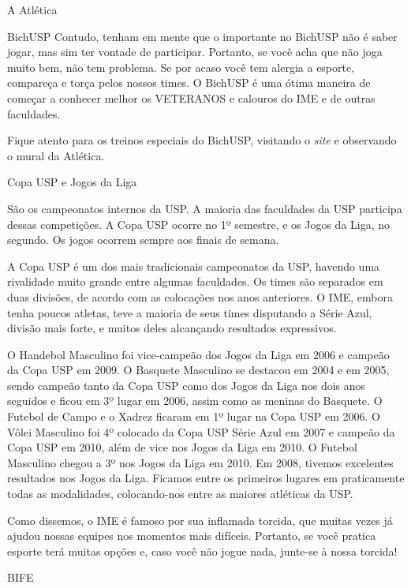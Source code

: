 \begin{secao}{A Atlética}
\begin{subsecao}{BichUSP}
Contudo, tenham em mente que o importante no BichUSP não é saber jogar, mas sim
ter vontade de participar.  Portanto, se você acha que não joga muito bem, não
tem problema. Se por acaso você tem alergia a esporte, compareça e torça pelos
nossos times. O BichUSP é uma ótima maneira de começar a conhecer melhor os
VETERANOS e calouros do IME e de outras faculdades.

Fique atento para os treinos especiais do BichUSP, visitando o \textit{site} e
observando o mural da Atlética.

\end{subsecao}
\begin{subsecao}{Copa USP e Jogos da Liga}

São os campeonatos internos da USP. A maioria das faculdades da USP participa
dessas competições. A Copa USP ocorre no 1º semestre, e os Jogos da Liga,
no segundo. Os jogos ocorrem sempre aos finais de semana.

A Copa USP é um dos mais tradicionais campeonatos da USP, havendo uma
rivalidade muito grande entre algumas faculdades. Os times são separados em
duas divisões, de acordo com as colocações nos anos anteriores. O IME, embora
tenha poucos atletas, teve a maioria de seus times disputando a Série Azul,
divisão mais forte, e muitos deles alcançando resultados expressivos.

O Handebol Masculino foi vice-campeão dos Jogos da Liga em 2006 e campeão da
Copa USP em 2009. O Basquete Masculino se destacou em 2004 e em 2005, sendo
campeão tanto da Copa USP como dos Jogos da Liga nos dois anos seguidos e ficou
em 3º lugar em 2006, assim como as meninas do Basquete. O Futebol de
Campo e o Xadrez ficaram em 1º lugar na Copa USP em 2006. O Vôlei
Masculino foi 4º colocado da Copa USP Série Azul em 2007 e campeão da Copa
USP em 2010, além de vice nos Jogos da Liga em 2010. O Futebol Masculino chegou
a 3º nos Jogos da Liga em 2010.
Em 2008, tivemos excelentes resultados nos Jogos da Liga. Ficamos entre os
primeiros lugares em praticamente todas as modalidades, colocando-nos entre as
maiores atléticas da USP.

Como dissemos, o IME é famoso por sua inflamada torcida, que muitas vezes já
ajudou nossas equipes nos momentos mais difíceis. Portanto, se você pratica
esporte terá muitas opções e, caso você não jogue nada, junte-se à nossa torcida!

\end{subsecao}
\begin{subsecao}{BIFE}


\end{subsecao}
\end{secao}
